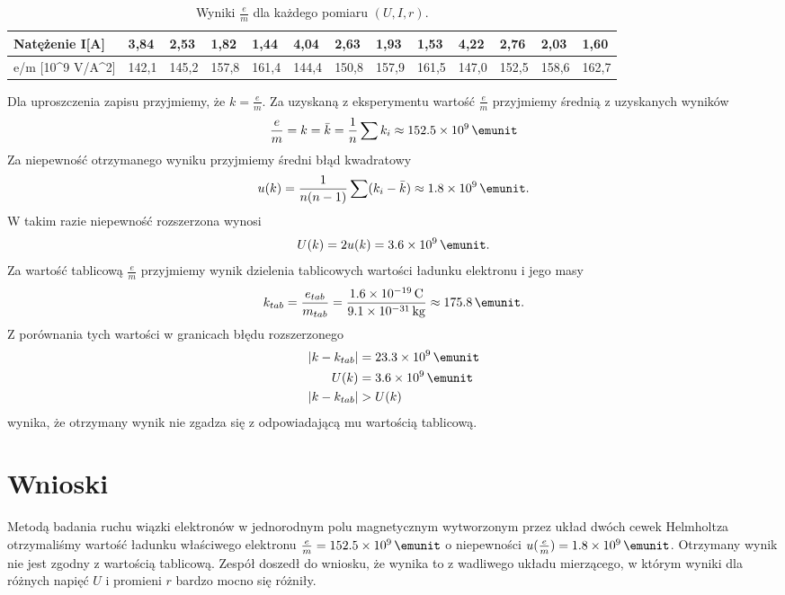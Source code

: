 \documentclass{article}
\begin{document}
\begin{table}[H]
\begin{tabular}{|l|llll|llll|llll|}
Natężenie I{[}A{]}                                      & \multicolumn{1}{l|}{3,84}  & \multicolumn{1}{l|}{2,53}  & \multicolumn{1}{l|}{1,82}  & 1,44                       & \multicolumn{1}{l|}{4,04}  & \multicolumn{1}{l|}{2,63}  & \multicolumn{1}{l|}{1,93}  & 1,53                       & \multicolumn{1}{l|}{4,22}  & \multicolumn{1}{l|}{2,76}  & \multicolumn{1}{l|}{2,03}  & 1,60                       \\ \hline
e/m  {[}10\textasciicircum{}9 V/A\textasciicircum{}2{]} & \multicolumn{1}{c|}{142,1} & \multicolumn{1}{c|}{145,2} & \multicolumn{1}{c|}{157,8} & \multicolumn{1}{c|}{161,4} & \multicolumn{1}{c|}{144,4} & \multicolumn{1}{c|}{150,8} & \multicolumn{1}{c|}{157,9} & \multicolumn{1}{c|}{161,5} & \multicolumn{1}{c|}{147,0} & \multicolumn{1}{c|}{152,5} & \multicolumn{1}{c|}{158,6} & \multicolumn{1}{c|}{162,7} \\ \hline
\end{tabular}
\caption{Wyniki $\frac{e}{m}$ dla każdego pomiaru $(U, I, r)$.}
\label{tab:2}
\end{table}
Dla uproszczenia zapisu przyjmiemy, że $k = \frac{e}{m}$.
Za uzyskaną z eksperymentu wartość $\frac{e}{m}$ przyjmiemy
średnią z uzyskanych wyników
\begin{align*}
    \frac{e}{m} = k = \bar{k} = \frac{1}{n}\sum k_i \approx \SI{152.5e9}{\emunit}
\end{align*}
Za niepewność otrzymanego wyniku przyjmiemy średni błąd kwadratowy
\begin{align*}
    u(k) = \frac{1}{n(n-1)}\sum(k_i - \bar{k}) \approx \SI{1.8e9}{\emunit}.
\end{align*}
W takim razie niepewność rozszerzona wynosi
\begin{align*}
    U(k) = 2u(k) = \SI{3.6e9}{\emunit}.
\end{align*}
Za wartość tablicową $\frac{e}{m}$ przyjmiemy wynik dzielenia
tablicowych wartości ładunku elektronu i jego masy
\begin{align*}
    k_{tab} = \frac{e_{tab}}{m_{tab}} = \frac{\SI{1.6e-19}{C}}{\SI{9.1e-31}{kg}} \approx \SI{175.8}{\emunit}.
\end{align*}
Z porównania tych wartości w granicach błędu rozszerzonego
\begin{align*}
    |k - k_{tab}| &= \SI{23.3e9}{\emunit}\\
    U(k) &= \SI{3.6e9}{\emunit}\\
    |k - k_{tab}| &> U(k)
\end{align*}
wynika, że otrzymany wynik nie zgadza się z odpowiadającą mu
wartością tablicową.
\section{Wnioski}
Metodą badania ruchu wiązki elektronów w jednorodnym polu
magnetycznym wytworzonym przez układ dwóch cewek Helmholtza
otrzymaliśmy wartość ładunku właściwego elektronu 
$\frac{e}{m} = \SI{152.5e9}{\emunit}$ o niepewności 
$u(\frac{e}{m}) = \SI{1.8e9}{\emunit}$. Otrzymany wynik nie jest
zgodny z wartością tablicową. Zespół doszedł do wniosku, że wynika
to z wadliwego układu mierzącego, w którym wyniki dla różnych
napięć $U$ i promieni $r$ bardzo mocno się różniły.
\end{document}
